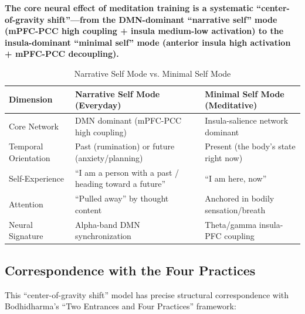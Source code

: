 \documentclass[11pt,a4paper]{article}
\begin{document}
\textbf{The core neural effect of meditation training is a systematic ``center-of-gravity shift''---from the DMN-dominant ``narrative self'' mode (mPFC-PCC high coupling + insula medium-low activation) to the insula-dominant ``minimal self'' mode (anterior insula high activation + mPFC-PCC decoupling).}

\begin{table}[htbp]
\centering
\caption{Narrative Self Mode vs. Minimal Self Mode}
\label{tab:self_modes}
\begin{tabular}{@{}p{3cm}p{5cm}p{5cm}@{}}
\toprule
\textbf{Dimension} & \textbf{Narrative Self Mode (Everyday)} & \textbf{Minimal Self Mode (Meditative)} \\
\midrule
Core Network & DMN dominant (mPFC-PCC high coupling) & Insula-salience network dominant \\
Temporal Orientation & Past (rumination) or future (anxiety/planning) & Present (the body's state right now) \\
Self-Experience & ``I am a person with a past / heading toward a future'' & ``I am here, now'' \\
Attention & ``Pulled away'' by thought content & Anchored in bodily sensation/breath \\
Neural Signature & Alpha-band DMN synchronization & Theta/gamma insula-PFC coupling \\
\bottomrule
\end{tabular}
\end{table}

\subsection{Correspondence with the Four Practices}

This ``center-of-gravity shift'' model has precise structural correspondence with Bodhidharma's ``Two Entrances and Four Practices'' framework:
\end{document}
